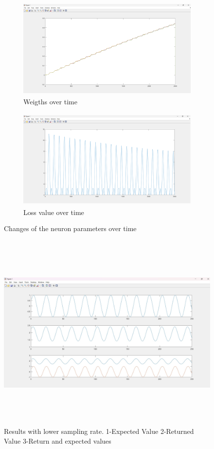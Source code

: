 \documentclass{article}
\begin{document}
\begin{figure}[h]

\begin{subfigure}{0.5\textwidth}
    \includegraphics[width=0.99\linewidth, height=5cm]{pics/aa.png}
    \caption{Weigths over time}
    \label{fig:my_label}
\end{subfigure}
\begin{subfigure}{0.5\textwidth}
    \includegraphics[width=0.99\linewidth, height=5cm]{pics/bb.png}
    \caption{Loss value over time}
    \label{fig:subim2}
\end{subfigure}

\caption{Changes of the neuron parameters over time}
\label{fig:image2}
\end{figure}


\begin{figure}[h]
    \centering
    \includegraphics[width=0.9\linewidth, height=10cm]{pics/results_2.jpg}
    \caption{Results with lower sampling rate. 1-Expected Value 2-Returned Value 3-Return and expected values}
    \label{fig:my_label}
\end{figure}
\end{document}
